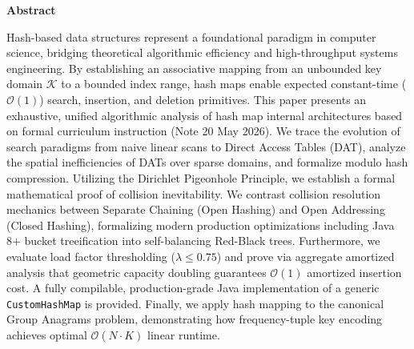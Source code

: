 \documentclass[10pt,twocolumn,letterpaper]{article}
\begin{document}

\thispagestyle{firstpage}

\begin{center}
  {\bfseries\large Abstract}
\end{center}
\vspace{-0.5em}
{\small Hash-based data structures represent a foundational paradigm in computer science, bridging theoretical algorithmic efficiency and high-throughput systems engineering. By establishing an associative mapping from an unbounded key domain $\mathcal{K}$ to a bounded index range, hash maps enable expected constant-time ($\mathcal{O}(1)$) search, insertion, and deletion primitives. This paper presents an exhaustive, unified algorithmic analysis of hash map internal architectures based on formal curriculum instruction (Note 20 May 2026). We trace the evolution of search paradigms from naive linear scans to Direct Access Tables (DAT), analyze the spatial inefficiencies of DATs over sparse domains, and formalize modulo hash compression. Utilizing the Dirichlet Pigeonhole Principle, we establish a formal mathematical proof of collision inevitability. We contrast collision resolution mechanics between Separate Chaining (Open Hashing) and Open Addressing (Closed Hashing), formalizing modern production optimizations including Java 8+ bucket treeification into self-balancing Red-Black trees. Furthermore, we evaluate load factor thresholding ($\lambda \le 0.75$) and prove via aggregate amortized analysis that geometric capacity doubling guarantees $\mathcal{O}(1)$ amortized insertion cost. A fully compilable, production-grade Java implementation of a generic \texttt{CustomHashMap} is provided. Finally, we apply hash mapping to the canonical Group Anagrams problem, demonstrating how frequency-tuple key encoding achieves optimal $\mathcal{O}(N \cdot K)$ linear runtime.}
\end{document}
